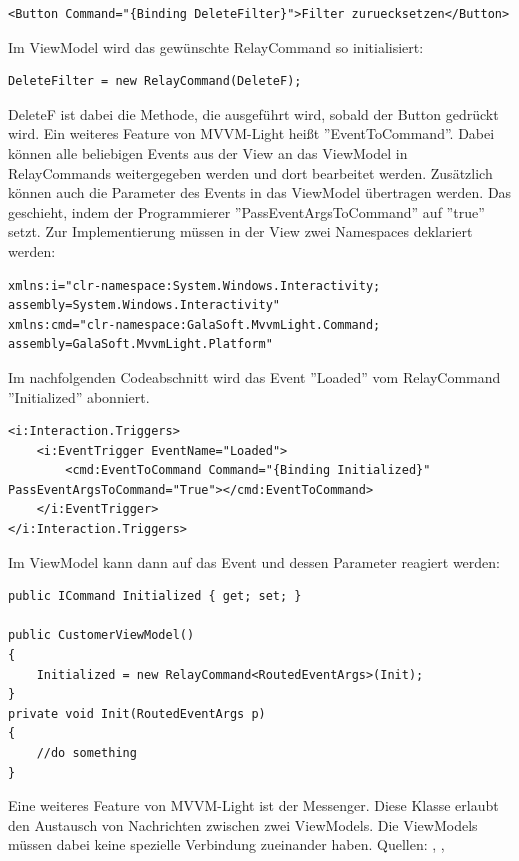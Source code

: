\begin{lstlisting}
<Button Command="{Binding DeleteFilter}">Filter zuruecksetzen</Button>
\end{lstlisting}
\noindent Im ViewModel wird das gewünschte RelayCommand so initialisiert:
\begin{lstlisting}
DeleteFilter = new RelayCommand(DeleteF);
\end{lstlisting}
DeleteF ist dabei die Methode, die ausgeführt wird, sobald der Button gedrückt wird. \newline Ein weiteres Feature von MVVM-Light heißt ''EventToCommand''. Dabei können alle beliebigen Events aus der View an das ViewModel in RelayCommands weitergegeben werden und dort bearbeitet werden. Zusätzlich können auch die Parameter des Events in das ViewModel übertragen werden. Das geschieht, indem der Programmierer ''PassEventArgsToCommand'' auf ''true'' setzt. Zur Implementierung müssen in der View zwei Namespaces deklariert werden:
\begin{lstlisting}
xmlns:i="clr-namespace:System.Windows.Interactivity;
assembly=System.Windows.Interactivity"
xmlns:cmd="clr-namespace:GalaSoft.MvvmLight.Command;
assembly=GalaSoft.MvvmLight.Platform"
\end{lstlisting}
Im nachfolgenden Codeabschnitt wird das Event ''Loaded'' vom RelayCommand ''Initialized'' abonniert.
\begin{lstlisting}
<i:Interaction.Triggers>
	<i:EventTrigger EventName="Loaded">
		<cmd:EventToCommand Command="{Binding Initialized}" PassEventArgsToCommand="True"></cmd:EventToCommand>
	</i:EventTrigger>
</i:Interaction.Triggers>
\end{lstlisting}
Im ViewModel kann dann auf das Event und dessen Parameter reagiert werden:
\begin{lstlisting}
public ICommand Initialized { get; set; }

public CustomerViewModel()
{
	Initialized = new RelayCommand<RoutedEventArgs>(Init);
}
private void Init(RoutedEventArgs p)
{
	//do something
}
\end{lstlisting}
Eine weiteres Feature von MVVM-Light ist der Messenger. Diese Klasse erlaubt den Austausch von Nachrichten zwischen zwei ViewModels. Die ViewModels müssen dabei keine spezielle Verbindung zueinander haben.
\newline Quellen: \cite{dotnetcurry_using_2018}, \cite{dotnetpattern_mvvm_2018}, \cite{microsoft_mvvm_2018}


